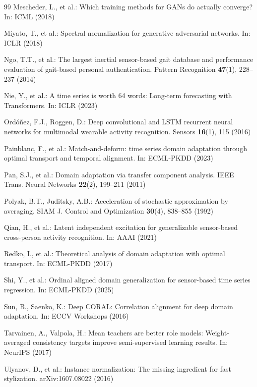 \documentclass[conference]{IEEEtran}
\begin{document}
\begin{thebibliography}{99}
Mescheder, L., et al.: Which training methods for GANs do actually converge? In: ICML (2018)

Miyato, T., et al.: Spectral normalization for generative adversarial networks. In: ICLR (2018)

Ngo, T.T., et al.: The largest inertial sensor-based gait database and performance evaluation of gait-based personal authentication. Pattern Recognition \textbf{47}(1), 228--237 (2014)

Nie, Y., et al.: A time series is worth 64 words: Long-term forecasting with Transformers. In: ICLR (2023)

Ordóñez, F.J., Roggen, D.: Deep convolutional and LSTM recurrent neural networks for multimodal wearable activity recognition. Sensors \textbf{16}(1), 115 (2016)

Painblanc, F., et al.: Match-and-deform: time series domain adaptation through optimal transport and temporal alignment. In: ECML-PKDD (2023)

Pan, S.J., et al.: Domain adaptation via transfer component analysis. IEEE Trans. Neural Networks \textbf{22}(2), 199--211 (2011)

Polyak, B.T., Juditsky, A.B.: Acceleration of stochastic approximation by averaging. SIAM J. Control and Optimization \textbf{30}(4), 838--855 (1992)

Qian, H., et al.: Latent independent excitation for generalizable sensor-based cross-person activity recognition. In: AAAI (2021)

Redko, I., et al.: Theoretical analysis of domain adaptation with optimal transport. In: ECML-PKDD (2017)

Shi, Y., et al.: Ordinal aligned domain generalization for sensor-based time series regression. In: ECML-PKDD (2025)

Sun, B., Saenko, K.: Deep CORAL: Correlation alignment for deep domain adaptation. In: ECCV Workshops (2016)

Tarvainen, A., Valpola, H.: Mean teachers are better role models: Weight-averaged consistency targets improve semi-supervised learning results. In: NeurIPS (2017)

Ulyanov, D., et al.: Instance normalization: The missing ingredient for fast stylization. arXiv:1607.08022 (2016)


\end{thebibliography}
\end{document}
